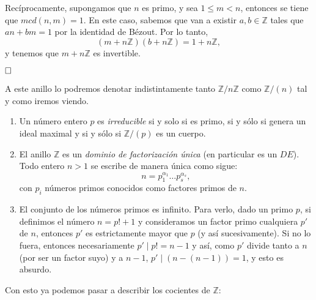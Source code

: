 \documentclass[12pt]{article}
\begin{document}
Recíprocamente, supongamos que $n$ es primo, y sea $1 \leq m < n$, entonces se tiene que $mcd(n,m)=1$.  En este caso, sabemos que van a existir $a,b \in \mathbb{Z}$ tales que $an+bm = 1$ por la identidad de Bézout. Por lo tanto, $$(m+n\mathbb{Z})(b+n\mathbb{Z}) = 1+n\mathbb{Z},$$ y tenemos que $m+n\mathbb{Z}$ es invertible.

$\hfill \square$

A este anillo lo podremos denotar indistintamente tanto $\mathbb{Z}/n\mathbb{Z}$ como $\mathbb{Z}/(n)$ tal y como iremos viendo.

\begin{enumerate}
\item Un número entero $p$ es \textit{irreducible} si y solo si es primo, si y sólo si genera un ideal maximal y si y sólo si $\mathbb{Z}/(p)$ es un cuerpo.
\item El anillo $\mathbb{Z}$ es un \textit{dominio de factorización única} (en particular es un $DE$). Todo entero $n >1$ se escribe de manera única como sigue: $$n = p_{1}^{\alpha_{1}} \ldots p_{s}^{\alpha_{s}},$$ con $p_{i}$ números primos conocidos como factores primos de $n$.
\item El conjunto de los números primos es infinito. Para verlo, dado un primo $p$, si definimos el número $n = p!+1$ y consideramos un factor primo cualquiera $p'$ de $n$, entonces $p'$ es estrictamente mayor que $p$ (y así sucesivamente). Si no lo fuera, entonces necesariamente $p' \mid p! = n-1$ y así, como $p'$ divide tanto a $n$ (por ser un factor suyo) y a $n-1$, $p' \mid (n-(n-1)) = 1$, y esto es absurdo.
\end{enumerate}

Con esto ya podemos pasar a describir los cocientes de $\mathbb{Z}$:
\end{document}
